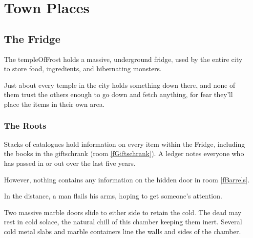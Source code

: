 \chapter{Town Places}

\section{The Fridge}

\begin{multicols}{2}

\noindent
The \gls{templeOfFrost} holds a massive, underground fridge, used by the entire city to store food, \glspl{ingredient}, and hibernating \glspl{monster}.

Just about every \gls{temple} in the city holds something down there, and none of them trust the others enough to go down and fetch anything, for fear they'll place the items in their own area.

\renewcommand\csComments{
  \callout{18,5}{-2,-2}{\ref{fGnomePassages}: \nameref{fGnomePassages}}{}
  \callout{7.5,0}{0,2.5}{\ref{fGuardDoor}: \nameref{fGuardDoor}}{}
  \mapFeature{15,9}{S}
}


\subsection{The Roots}






Stacks of catalogues hold information on every item within the Fridge, including the books in the giftschrank (room \vref{fGiftschrank}).
A ledger notes everyone who has passed in or out over the last five years.

However, nothing contains any information on the hidden door in room \vref{fBarrels}.


In the distance, a man flails his arms, hoping to get someone's attention.


Two massive marble doors slide to either side to retain the cold.
The dead may rest in cold solace, the natural chill of this chamber keeping them inert.
Several cold metal slabs and marble containers line the walls and sides of the chamber. 


\end{multicols}

